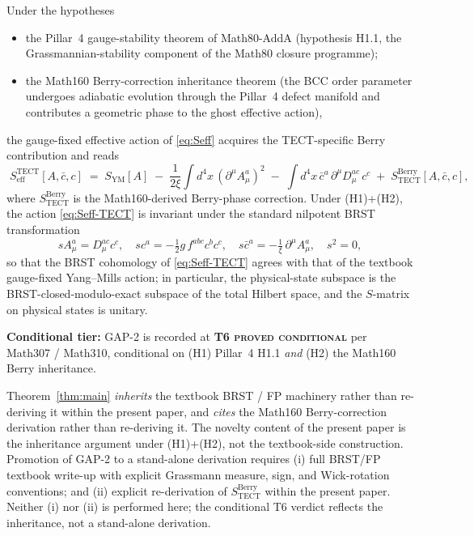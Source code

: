 \begin{theorem}\label{thm:main}
Under the hypotheses
\begin{itemize}
  \item[(\textbf{H1})] the Pillar~4 gauge-stability theorem of
    Math80-AddA (hypothesis H1.1, the Grassmannian-stability
    component of the Math80 closure programme);
  \item[(\textbf{H2})] the Math160 Berry-correction inheritance
    theorem (the BCC order parameter undergoes adiabatic evolution
    through the Pillar~4 defect manifold and contributes a
    geometric phase to the ghost effective action),
\end{itemize}
the gauge-fixed effective action of \eqref{eq:Seff} acquires the
TECT-specific Berry contribution and reads
\begin{equation}\label{eq:Seff-TECT}
  \boxed{\;
  S_{\mathrm{eff}}^{\mathrm{TECT}}[A,\bar c,c]
  \;=\;
  S_{\mathrm{YM}}[A]
  \;-\;\frac{1}{2\xi}\!\int d^4x\,(\partial^{\mu}A^{a}_{\mu})^{2}
  \;-\;\!\int d^4x\,\bar c^{a}\,\partial^{\mu}D_{\mu}^{ac}\,c^{c}
  \;+\;
  S^{\mathrm{Berry}}_{\mathrm{TECT}}[A,\bar c,c],
  \;}
\end{equation}
where $S^{\mathrm{Berry}}_{\mathrm{TECT}}$ is the Math160-derived
Berry-phase correction. Under (H1)+(H2), the action
\eqref{eq:Seff-TECT} is invariant under the standard nilpotent BRST
transformation
\begin{equation}\label{eq:BRST}
  s A^{a}_\mu = D^{ac}_\mu c^{c}, \quad
  s c^{a} = -\tfrac{1}{2}g\,f^{abc}c^{b}c^{c}, \quad
  s \bar c^{a} = -\tfrac{1}{\xi}\,\partial^{\mu}A^{a}_{\mu},
  \quad s^{2}=0,
\end{equation}
so that the BRST cohomology of \eqref{eq:Seff-TECT} agrees with that
of the textbook gauge-fixed Yang--Mills action; in particular, the
physical-state subspace is the BRST-closed-modulo-exact subspace of
the total Hilbert space, and the $S$-matrix on physical states is
unitary.

\textbf{Conditional tier:} GAP-2 is recorded at \textbf{T6
\textsc{proved conditional}} per Math307 / Math310, conditional on
(H1) Pillar~4 H1.1 \emph{and} (H2) the Math160 Berry inheritance.
\end{theorem}

\begin{remark}\label{rmk:honest}
Theorem~\ref{thm:main} \emph{inherits} the textbook BRST / FP
machinery rather than re-deriving it within the present paper, and
\emph{cites} the Math160 Berry-correction derivation rather than
re-deriving it. The novelty content of the present paper is the
inheritance argument under (H1)+(H2), not the textbook-side
construction. Promotion of GAP-2 to a stand-alone derivation
requires (i) full BRST/FP textbook write-up with explicit Grassmann
measure, sign, and Wick-rotation conventions; and (ii) explicit
re-derivation of $S^{\mathrm{Berry}}_{\mathrm{TECT}}$ within the
present paper. Neither (i) nor (ii) is performed here; the
conditional T6 verdict reflects the inheritance, not a stand-alone
derivation.
\end{remark}

